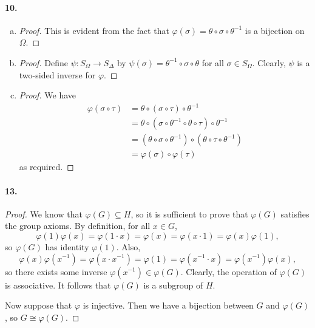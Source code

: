 \documentclass{article}
\begin{document}
\paragraph{10.}
\begin{enumerate}[(a)]
  \item \begin{proof}
      This is evident from the fact that $\varphi(\sigma) = \theta \circ \sigma
      \circ \theta^{-1}$ is a bijection on $\Omega$.
    \end{proof}
  \item \begin{proof}
      Define $\psi: S_\Omega \to S_\Delta$ by $\psi(\sigma) = \theta^{-1}
      \circ \sigma \circ \theta$ for all $\sigma \in S_\Omega$. Clearly, $\psi$
      is a two-sided inverse for $\varphi$.
    \end{proof}
  \item \begin{proof}
      We have \begin{align*}
        \varphi(\sigma \circ \tau)
        &= \theta \circ (\sigma \circ \tau) \circ \theta^{-1} \\
        &= \theta \circ (\sigma \circ \theta^{-1} \circ \theta \circ \tau)
        \circ \theta^{-1} \\
        &= (\theta \circ \sigma \circ \theta^{-1}) \circ (\theta \circ \tau
        \circ \theta^{-1}) \\
        &= \varphi(\sigma) \circ \varphi(\tau)
      \end{align*} as required.
    \end{proof}
\end{enumerate}

\paragraph{13.}
\begin{proof}
  We know that $\varphi(G) \subseteq H$, so it is sufficient to prove that
  $\varphi(G)$ satisfies the group axioms. By definition, for all $x \in G$, \[
    \varphi(1)\varphi(x) = \varphi(1 \cdot x) = \varphi(x) = \varphi(x \cdot 1)
    = \varphi(x)\varphi(1),
  \] so $\varphi(G)$ has identity $\varphi(1)$. Also, \[
    \varphi(x)\varphi(x^{-1}) = \varphi(x \cdot x^{-1}) = \varphi(1) = \varphi(x^{-1} \cdot x)
    = \varphi(x^{-1})\varphi(x),
  \] so there exists some inverse $\varphi(x^{-1}) \in \varphi(G)$. Clearly, the
  operation of $\varphi(G)$ is associative. It follows that $\varphi(G)$ is a
  subgroup of $H$.

  Now suppose that $\varphi$ is injective. Then we have a bijection between $G$
  and $\varphi(G)$, so $G \cong \varphi(G)$.
\end{proof}
\end{document}
